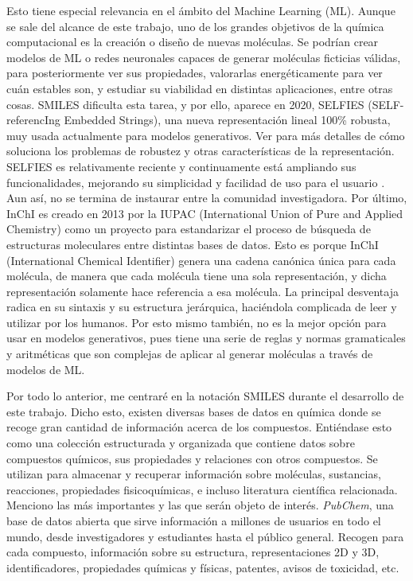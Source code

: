 Esto tiene especial relevancia en el ámbito del Machine Learning (ML). Aunque se sale del alcance de este trabajo, uno de los grandes objetivos de la química computacional es la creación o diseño de nuevas moléculas. Se podrían crear modelos de ML o redes neuronales capaces de generar moléculas ficticias válidas, para posteriormente ver sus propiedades, valorarlas energéticamente para ver cuán estables son, y estudiar su viabilidad en distintas aplicaciones, entre otras cosas. SMILES dificulta esta tarea, y por ello, aparece en 2020, SELFIES (SELF-referencIng Embedded Strings), una nueva representación lineal 100\% robusta, muy usada actualmente para modelos generativos. Ver \cite{SELFIES, krenn_self_referencing_2020} para más detalles de cómo soluciona los problemas de robustez y otras características de la representación. SELFIES es relativamente reciente y continuamente está ampliando sus funcionalidades, mejorando su simplicidad y facilidad de uso para el usuario \cite{selfies_recent_2023}. Aun así, no se termina de instaurar entre la comunidad investigadora. Por último, InChI es creado en 2013 por la IUPAC (International Union of Pure and Applied Chemistry) como un proyecto para estandarizar el proceso de búsqueda de estructuras moleculares entre distintas bases de datos. Esto es porque InChI (International Chemical Identifier) genera una cadena canónica única para cada molécula, de manera que cada molécula tiene una sola representación, y dicha representación solamente hace referencia a esa molécula. La principal desventaja radica en su sintaxis y su estructura jerárquica, haciéndola complicada de leer y utilizar por los humanos. Por esto mismo también, no es la mejor opción para usar en modelos generativos, pues tiene una serie de reglas y normas gramaticales y aritméticas que son complejas de aplicar al generar moléculas a través de modelos de ML.\cite{heller_inchi_2015}


Por todo lo anterior, me centraré en la notación SMILES durante el desarrollo de este trabajo. Dicho esto, existen diversas bases de datos en química donde se recoge gran cantidad de información acerca de los compuestos. Entiéndase esto como una colección estructurada y organizada que contiene datos sobre compuestos químicos, sus propiedades y relaciones con otros compuestos. Se utilizan para almacenar y recuperar información sobre moléculas, sustancias, reacciones, propiedades fisicoquímicas, e incluso literatura científica relacionada. Menciono las más importantes y las que serán objeto de interés. \emph{PubChem}, una base de datos abierta que sirve información a millones de usuarios en todo el mundo, desde investigadores y estudiantes hasta el público general. Recogen para cada compuesto, información sobre su estructura, representaciones 2D y 3D, identificadores, propiedades químicas y físicas, patentes, avisos de toxicidad, etc. \cite{pubchem_website} 


